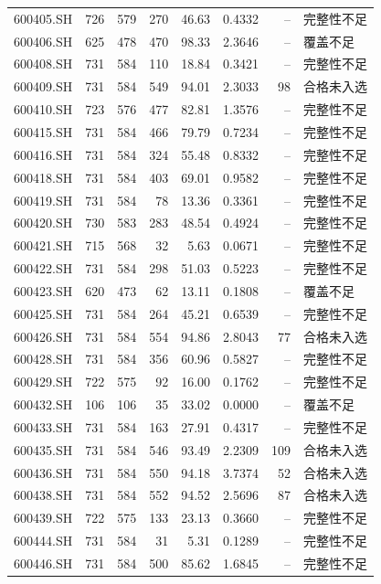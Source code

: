 \documentclass[10pt,a4paper]{article}
\begin{document}
\begin{longtable}{lrrr r r r l}
600405.SH & 726 & 579 & 270 & 46.63 & 0.4332 & -- & 完整性不足\\
600406.SH & 625 & 478 & 470 & 98.33 & 2.3646 & -- & 覆盖不足\\
600408.SH & 731 & 584 & 110 & 18.84 & 0.3421 & -- & 完整性不足\\
600409.SH & 731 & 584 & 549 & 94.01 & 2.3033 & 98 & 合格未入选\\
600410.SH & 723 & 576 & 477 & 82.81 & 1.3576 & -- & 完整性不足\\
600415.SH & 731 & 584 & 466 & 79.79 & 0.7234 & -- & 完整性不足\\
600416.SH & 731 & 584 & 324 & 55.48 & 0.8332 & -- & 完整性不足\\
600418.SH & 731 & 584 & 403 & 69.01 & 0.9582 & -- & 完整性不足\\
600419.SH & 731 & 584 & 78 & 13.36 & 0.3361 & -- & 完整性不足\\
600420.SH & 730 & 583 & 283 & 48.54 & 0.4924 & -- & 完整性不足\\
600421.SH & 715 & 568 & 32 & 5.63 & 0.0671 & -- & 完整性不足\\
600422.SH & 731 & 584 & 298 & 51.03 & 0.5223 & -- & 完整性不足\\
600423.SH & 620 & 473 & 62 & 13.11 & 0.1808 & -- & 覆盖不足\\
600425.SH & 731 & 584 & 264 & 45.21 & 0.6539 & -- & 完整性不足\\
600426.SH & 731 & 584 & 554 & 94.86 & 2.8043 & 77 & 合格未入选\\
600428.SH & 731 & 584 & 356 & 60.96 & 0.5827 & -- & 完整性不足\\
600429.SH & 722 & 575 & 92 & 16.00 & 0.1762 & -- & 完整性不足\\
600432.SH & 106 & 106 & 35 & 33.02 & 0.0000 & -- & 覆盖不足\\
600433.SH & 731 & 584 & 163 & 27.91 & 0.4317 & -- & 完整性不足\\
600435.SH & 731 & 584 & 546 & 93.49 & 2.2309 & 109 & 合格未入选\\
600436.SH & 731 & 584 & 550 & 94.18 & 3.7374 & 52 & 合格未入选\\
600438.SH & 731 & 584 & 552 & 94.52 & 2.5696 & 87 & 合格未入选\\
600439.SH & 722 & 575 & 133 & 23.13 & 0.3660 & -- & 完整性不足\\
600444.SH & 731 & 584 & 31 & 5.31 & 0.1289 & -- & 完整性不足\\
600446.SH & 731 & 584 & 500 & 85.62 & 1.6845 & -- & 完整性不足\\

\end{longtable}
\end{document}
